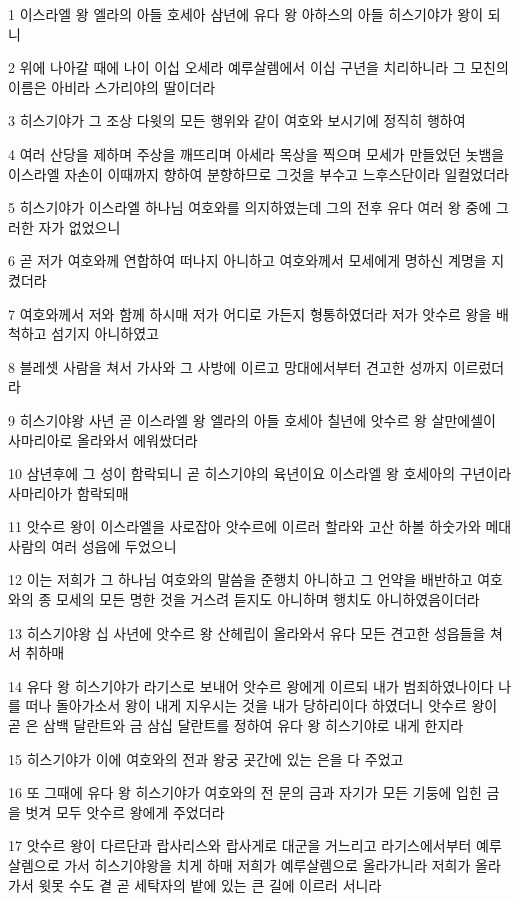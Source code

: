 \par 1 이스라엘 왕 엘라의 아들 호세아 삼년에 유다 왕 아하스의 아들 히스기야가 왕이 되니
\par 2 위에 나아갈 때에 나이 이십 오세라 예루살렘에서 이십 구년을 치리하니라 그 모친의 이름은 아비라 스가리야의 딸이더라
\par 3 히스기야가 그 조상 다윗의 모든 행위와 같이 여호와 보시기에 정직히 행하여
\par 4 여러 산당을 제하며 주상을 깨뜨리며 아세라 목상을 찍으며 모세가 만들었던 놋뱀을 이스라엘 자손이 이때까지 향하여 분향하므로 그것을 부수고 느후스단이라 일컬었더라
\par 5 히스기야가 이스라엘 하나님 여호와를 의지하였는데 그의 전후 유다 여러 왕 중에 그러한 자가 없었으니
\par 6 곧 저가 여호와께 연합하여 떠나지 아니하고 여호와께서 모세에게 명하신 계명을 지켰더라
\par 7 여호와께서 저와 함께 하시매 저가 어디로 가든지 형통하였더라 저가 앗수르 왕을 배척하고 섬기지 아니하였고
\par 8 블레셋 사람을 쳐서 가사와 그 사방에 이르고 망대에서부터 견고한 성까지 이르렀더라
\par 9 히스기야왕 사년 곧 이스라엘 왕 엘라의 아들 호세아 칠년에 앗수르 왕 살만에셀이 사마리아로 올라와서 에워쌌더라
\par 10 삼년후에 그 성이 함락되니 곧 히스기야의 육년이요 이스라엘 왕 호세아의 구년이라 사마리아가 함락되매
\par 11 앗수르 왕이 이스라엘을 사로잡아 앗수르에 이르러 할라와 고산 하볼 하숫가와 메대 사람의 여러 성읍에 두었으니
\par 12 이는 저희가 그 하나님 여호와의 말씀을 준행치 아니하고 그 언약을 배반하고 여호와의 종 모세의 모든 명한 것을 거스려 듣지도 아니하며 행치도 아니하였음이더라
\par 13 히스기야왕 십 사년에 앗수르 왕 산헤립이 올라와서 유다 모든 견고한 성읍들을 쳐서 취하매
\par 14 유다 왕 히스기야가 라기스로 보내어 앗수르 왕에게 이르되 내가 범죄하였나이다 나를 떠나 돌아가소서 왕이 내게 지우시는 것을 내가 당하리이다 하였더니 앗수르 왕이 곧 은 삼백 달란트와 금 삼십 달란트를 정하여 유다 왕 히스기야로 내게 한지라
\par 15 히스기야가 이에 여호와의 전과 왕궁 곳간에 있는 은을 다 주었고
\par 16 또 그때에 유다 왕 히스기야가 여호와의 전 문의 금과 자기가 모든 기둥에 입힌 금을 벗겨 모두 앗수르 왕에게 주었더라
\par 17 앗수르 왕이 다르단과 랍사리스와 랍사게로 대군을 거느리고 라기스에서부터 예루살렘으로 가서 히스기야왕을 치게 하매 저희가 예루살렘으로 올라가니라 저희가 올라가서 윗못 수도 곁 곧 세탁자의 밭에 있는 큰 길에 이르러 서니라
